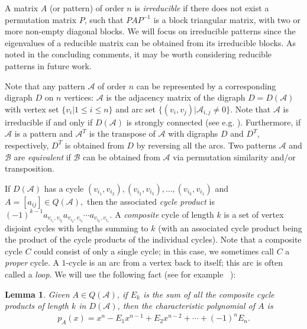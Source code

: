 \documentclass[10pt]{amsart}
\newtheorem{lemma}[proposition]{Lemma}
\begin{document}
A matrix $A$ (or pattern) of order $n$ is \emph{irreducible} if there does not exist a permutation matrix $P$, such that $PAP^{-1}$ is a block triangular matrix, with two or more non-empty diagonal blocks. We will focus on irreducible patterns since the
eigenvalues of a reducible matrix can be obtained from its irreducible blocks. As noted in the concluding comments, it may
be worth considering reducible patterns in future work.

 
Note that any pattern ${\mathcal{A}}$ of order $n$ can be represented by a corresponding digraph $D$ on $n$ vertices: 
${\mathcal{A}}$ is the adjacency matrix of the digraph $D=D({\mathcal{A}})$ with vertex set $\{v_i | 1 \leq i \leq n\}$ and arc set $\{(v_i, v_j) | {\mathcal{A}}_{i, j} \neq 0\}$. Note that ${\mathcal{A}}$ is irreducible if and only if $D({\mathcal{A}})$ is strongly connected (see e.g. \cite[Theorem 3.2.1]{B}).
Furthermore, if ${\mathcal{A}}$ is a pattern and ${\mathcal{A}}^T$ is the transpose of ${\mathcal{A}}$ with digraphs $D$ and $D^T$, respectively, $D^T$ is obtained from $D$ by reversing all the arcs. Two patterns ${\mathcal{A}}$ and ${\mathcal{B}}$ are \emph{equivalent} if ${\mathcal{B}}$ can be obtained from ${\mathcal{A}}$ via permutation similarity and/or transposition. 

If $D({\mathcal{A}})$ has a cycle 
$(v_{i_1},v_{i_2}),(v_{i_2},v_{i_3}),\ldots,(v_{i_{k}},v_{i_1})$
and $A=[a_{ij}]\in Q({\mathcal{A}}),$ then the associated \emph{cycle product} is $(-1)^{k-1}a_{v_{i_1},v_{i_2}}a_{v_{i_2},v_{i_3}}\cdots a_{v_{i_{k}},v_{i_1}}$. A \emph{composite} cycle of length $k$ is a set of vertex disjoint cycles with
lengths summing to $k$ (with an associated cycle product being the product of the cycle products of the individual
cycles). Note that a composite cycle $C$ could consist of only a single cycle; in this case, we sometimes
call $C$ a \emph{proper} cycle.
A $1$-cycle is an
arc from a vertex back to itself; this arc is often called a \emph{loop}.
We will use the following fact (see for example
~\cite[Section 9]{B}):
\begin{lemma}\label{cycleprod} 
Given $A\in Q({\mathcal{A}})$, if $E_k$ is the sum of all the composite cycle products of length $k$ in $D({\mathcal{A}})$,
then the characteristic polynomial of  
$A$ is 
\begin{eqnarray*}
p_A(x)=x^n-E_1x^{n-1}+E_2x^{n-2}+\cdots+(-1)^nE_n.
\end{eqnarray*}
\end{lemma}
\end{document}
